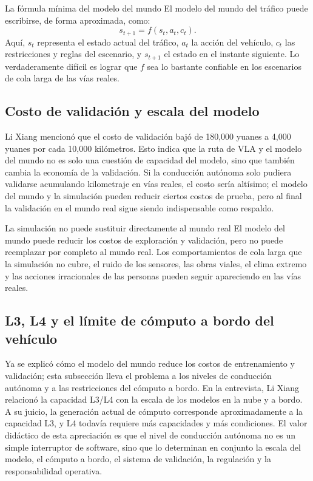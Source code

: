 \begin{importantbox}{La fórmula mínima del modelo del mundo}
El modelo del mundo del tráfico puede escribirse, de forma aproximada, como:
\[
s_{t+1} = f(s_t, a_t, c_t).
\]
Aquí, \(s_t\) representa el estado actual del tráfico, \(a_t\) la acción del vehículo, \(c_t\) las restricciones y reglas del escenario, y \(s_{t+1}\) el estado en el instante siguiente. Lo verdaderamente difícil es lograr que \(f\) sea lo bastante confiable en los escenarios de cola larga de las vías reales.
\end{importantbox}

\subsection{Costo de validación y escala del modelo}

Li Xiang mencionó que el costo de validación bajó de 180,000 yuanes a 4,000 yuanes por cada 10,000 kilómetros. Esto indica que la ruta de VLA y el modelo del mundo no es solo una cuestión de capacidad del modelo, sino que también cambia la economía de la validación. Si la conducción autónoma solo pudiera validarse acumulando kilometraje en vías reales, el costo sería altísimo; el modelo del mundo y la simulación pueden reducir ciertos costos de prueba, pero al final la validación en el mundo real sigue siendo indispensable como respaldo.

\begin{warningbox}{La simulación no puede sustituir directamente al mundo real}
El modelo del mundo puede reducir los costos de exploración y validación, pero no puede reemplazar por completo al mundo real. Los comportamientos de cola larga que la simulación no cubre, el ruido de los sensores, las obras viales, el clima extremo y las acciones irracionales de las personas pueden seguir apareciendo en las vías reales.
\end{warningbox}

\subsection{L3, L4 y el límite de cómputo a bordo del vehículo}

Ya se explicó cómo el modelo del mundo reduce los costos de entrenamiento y validación; esta subsección lleva el problema a los niveles de conducción autónoma y a las restricciones del cómputo a bordo. En la entrevista, Li Xiang relacionó la capacidad L3/L4 con la escala de los modelos en la nube y a bordo. A su juicio, la generación actual de cómputo corresponde aproximadamente a la capacidad L3, y L4 todavía requiere más capacidades y más condiciones. El valor didáctico de esta apreciación es que el nivel de conducción autónoma no es un simple interruptor de software, sino que lo determinan en conjunto la escala del modelo, el cómputo a bordo, el sistema de validación, la regulación y la responsabilidad operativa.

